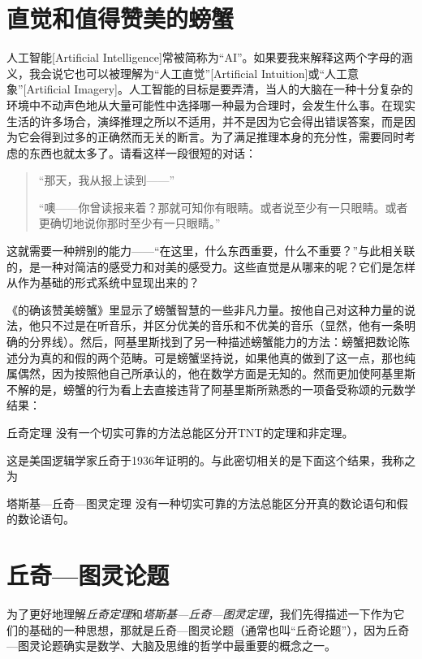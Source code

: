 \section{直觉和值得赞美的螃蟹}

人工智能[Artificial Intelligence]常被简称为“AI”。如果要我来解释这两个字母的涵义，我会说它也可以被理解为“人工直觉”[Artificial Intuition]或“人工意象”[Artificial Imagery]。人工智能的目标是要弄清，当人的大脑在一种十分复杂的环境中不动声色地从大量可能性中选择哪一种最为合理时，会发生什么事。在现实生活的许多场合，演绎推理之所以不适用，并不是因为它会得出错误答案，而是因为它会得到过多的正确然而无关的断言。为了满足推理本身的充分性，需要同时考虑的东西也就太多了。请看这样一段很短的对话：

\begin{quote}
“那天，我从报上读到——”

“噢——你曾读报来着？那就可知你有眼睛。或者说至少有一只眼睛。或者更确切地说你那时至少有一只眼睛。”
\end{quote}

这就需要一种辨别的能力——“在这里，什么东西重要，什么不重要？”与此相关联的，是一种对简洁的感受力和对美的感受力。这些直觉是从哪来的呢？它们是怎样从作为基础的形式系统中显现出来的？

《的确该赞美螃蟹》里显示了螃蟹智慧的一些非凡力量。按他自己对这种力量的说法，他只不过是在听音乐，并区分优美的音乐和不优美的音乐（显然，他有一条明确的分界线）。然后，阿基里斯找到了另一种描述螃蟹能力的方法：螃蟹把数论陈述分为真的和假的两个范畴。可是螃蟹坚持说，如果他真的做到了这一点，那也纯属偶然，因为按照他自己所承认的，他在数学方面是无知的。然而更加使阿基里斯不解的是，螃蟹的行为看上去直接违背了阿基里斯所熟悉的一项备受称颂的元数学结果：

\begin{thm}{丘奇定理}
没有一个切实可靠的方法总能区分开TNT的定理和非定理。
\end{thm}
这是美国逻辑学家丘奇于1936年证明的。与此密切相关的是下面这个结果，我称之为

\begin{thm}{塔斯基—丘奇—图灵定理}
没有一种切实可靠的方法总能区分开真的数论语句和假的数论语句。
\end{thm}

\section{丘奇—图灵论题}

为了更好地理解\emph{丘奇定理}和\emph{塔斯基—丘奇—图灵定理}，我们先得描述一下作为它们的基础的一种思想，那就是丘奇—图灵论题（通常也叫“丘奇论题”），因为丘奇—图灵论题确实是数学、大脑及思维的哲学中最重要的概念之一。

